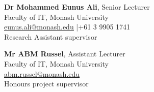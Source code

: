 \documentclass[11pt, a4paper]{article}
\let\hrefnoul\href
\renewcommand{\href}[2]{\hrefnoul{#1}{\ul{#2}}}
\begin{document}
\vspace{2pt}
\noindent
\begin{minipage}[t]{0.49\linewidth}
  \textbf{Dr Mohammed Eunus Ali}, Senior Lecturer\\
  Faculty of IT, Monash University\\
  \href{mailto:eunus.ali@monash.edu}{eunus.ali@monash.edu} \enspace|\enspace +61 3 9905 1741\\
  Research Assistant supervisor
\end{minipage}%
\hfill
\begin{minipage}[t]{0.49\linewidth}
  \textbf{Mr ABM Russel}, Assistant Lecturer\\
  Faculty of IT, Monash University\\
  \href{mailto:abm.russel@monash.edu}{abm.russel@monash.edu}\\
  Honours project supervisor
\end{minipage}

\end{document}
